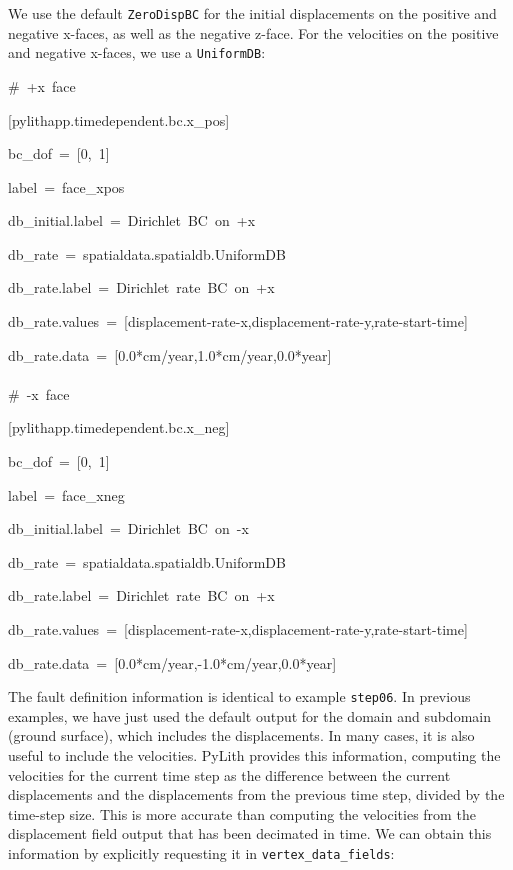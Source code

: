 We use the default \texttt{ZeroDispBC} for the initial displacements
on the positive and negative x-faces, as well as the negative z-face.
For the velocities on the positive and negative x-faces, we use a
\texttt{UniformDB}:
\begin{lyxcode}
\#~+x~face

{[}pylithapp.timedependent.bc.x\_pos{]}

bc\_dof~=~{[}0,~1{]}

label~=~face\_xpos

db\_initial.label~=~Dirichlet~BC~on~+x

db\_rate~=~spatialdata.spatialdb.UniformDB

db\_rate.label~=~Dirichlet~rate~BC~on~+x

db\_rate.values~=~{[}displacement-rate-x,displacement-rate-y,rate-start-time{]}

db\_rate.data~=~{[}0.0{*}cm/year,1.0{*}cm/year,0.0{*}year{]}~\\
~\\


\#~-x~face

{[}pylithapp.timedependent.bc.x\_neg{]}

bc\_dof~=~{[}0,~1{]}

label~=~face\_xneg

db\_initial.label~=~Dirichlet~BC~on~-x

db\_rate~=~spatialdata.spatialdb.UniformDB

db\_rate.label~=~Dirichlet~rate~BC~on~+x

db\_rate.values~=~{[}displacement-rate-x,displacement-rate-y,rate-start-time{]}

db\_rate.data~=~{[}0.0{*}cm/year,-1.0{*}cm/year,0.0{*}year{]}
\end{lyxcode}
The fault definition information is identical to example \texttt{step06}.
In previous examples, we have just used the default output for the
domain and subdomain (ground surface), which includes the displacements.
In many cases, it is also useful to include the velocities. PyLith
provides this information, computing the velocities for the current
time step as the difference between the current displacements and
the displacements from the previous time step, divided by the time-step
size. This is more accurate than computing the velocities from the
displacement field output that has been decimated in time. We can
obtain this information by explicitly requesting it in \texttt{vertex\_data\_fields}:
